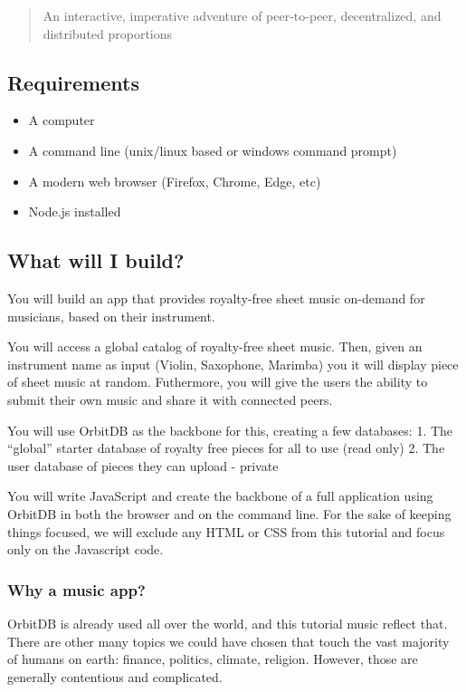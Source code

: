 \begin{quote}
An interactive, imperative adventure of peer-to-peer, decentralized, and
distributed proportions
\end{quote}

\subsection{Requirements}\label{requirements}

\begin{itemize}
\tightlist
\item
  A computer
\item
  A command line (unix/linux based or windows command prompt)
\item
  A modern web browser (Firefox, Chrome, Edge, etc)
\item
  Node.js installed
\end{itemize}

\subsection{What will I build?}\label{what-will-i-build}

You will build an app that provides royalty-free sheet music on-demand
for musicians, based on their instrument.

You will access a global catalog of royalty-free sheet music. Then,
given an instrument name as input (Violin, Saxophone, Marimba) you it
will display piece of sheet music at random. Futhermore, you will give
the users the ability to submit their own music and share it with
connected peers.

You will use OrbitDB as the backbone for this, creating a few databases:
1. The ``global'' starter database of royalty free pieces for all to use
(read only) 2. The user database of pieces they can upload - private

You will write JavaScript and create the backbone of a full application
using OrbitDB in both the browser and on the command line. For the sake
of keeping things focused, we will exclude any HTML or CSS from this
tutorial and focus only on the Javascript code.

\subsubsection{Why a music app?}\label{why-a-music-app}

OrbitDB is already used all over the world, and this tutorial music
reflect that. There are other many topics we could have chosen that
touch the vast majority of humans on earth: finance, politics, climate,
religion. However, those are generally contentious and complicated.

